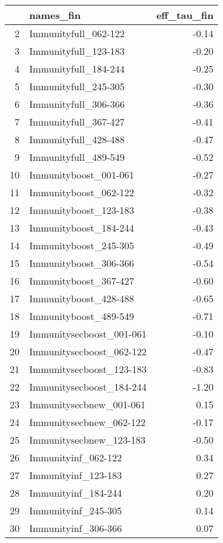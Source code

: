 \begin{table}[ht]
\centering
\begin{tabular}{rlr}
  \hline
 & names\_fin & eff\_tau\_fin \\ 
  \hline
2 & Immunityfull\_062-122 & -0.14 \\ 
  3 & Immunityfull\_123-183 & -0.20 \\ 
  4 & Immunityfull\_184-244 & -0.25 \\ 
  5 & Immunityfull\_245-305 & -0.30 \\ 
  6 & Immunityfull\_306-366 & -0.36 \\ 
  7 & Immunityfull\_367-427 & -0.41 \\ 
  8 & Immunityfull\_428-488 & -0.47 \\ 
  9 & Immunityfull\_489-549 & -0.52 \\ 
  10 & Immunityboost\_001-061 & -0.27 \\ 
  11 & Immunityboost\_062-122 & -0.32 \\ 
  12 & Immunityboost\_123-183 & -0.38 \\ 
  13 & Immunityboost\_184-244 & -0.43 \\ 
  14 & Immunityboost\_245-305 & -0.49 \\ 
  15 & Immunityboost\_306-366 & -0.54 \\ 
  16 & Immunityboost\_367-427 & -0.60 \\ 
  17 & Immunityboost\_428-488 & -0.65 \\ 
  18 & Immunityboost\_489-549 & -0.71 \\ 
  19 & Immunitysecboost\_001-061 & -0.10 \\ 
  20 & Immunitysecboost\_062-122 & -0.47 \\ 
  21 & Immunitysecboost\_123-183 & -0.83 \\ 
  22 & Immunitysecboost\_184-244 & -1.20 \\ 
  23 & Immunitysecbnew\_001-061 & 0.15 \\ 
  24 & Immunitysecbnew\_062-122 & -0.17 \\ 
  25 & Immunitysecbnew\_123-183 & -0.50 \\ 
  26 & Immunityinf\_062-122 & 0.34 \\ 
  27 & Immunityinf\_123-183 & 0.27 \\ 
  28 & Immunityinf\_184-244 & 0.20 \\ 
  29 & Immunityinf\_245-305 & 0.14 \\ 
  30 & Immunityinf\_306-366 & 0.07 \\ 

\end{tabular}
\end{table}

